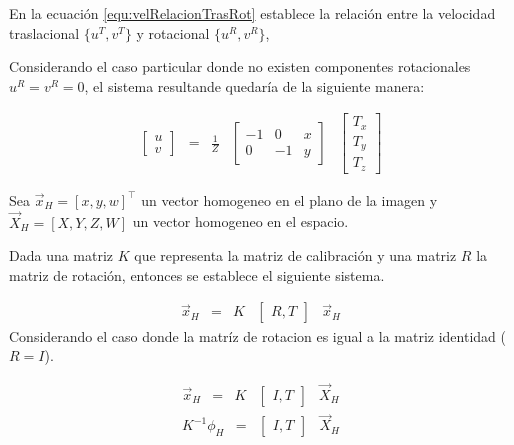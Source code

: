 En la ecuación \ref{equ:velRelacionTrasRot} establece la relación entre la velocidad traslacional $\{u^T,v^T\}$ y rotacional $\{u^R,v^R\}$,  

Considerando el caso particular donde no existen componentes rotacionales $u^R = v^R = 0$, el sistema resultande quedaría de la siguiente manera:

\begin{equation}
    \begin{aligned}
    \left[\begin{array}{c}
u \\
v
\end{array}\right]&=&\frac{1}{Z}&\left[\begin{array}{ccc}
    -1 & 0 & x  \\
     0 &-1 & y
\end{array}\right]&\left[\begin{array}{c}
T_x \\
T_y\\
T_z
\end{array}\right]   
\end{aligned}
\label{equ:flujoOpticoSistema}
\end{equation}

Sea $\vec{x}_H =[x,y,w]^\top$ un vector homogeneo en el plano de la imagen y $\vec{X}_H = [X,Y,Z,W]$ un vector homogeneo en el espacio.

Dada una matriz $K$ que representa la matriz de calibración y una matriz $R$ la matriz de rotación, entonces se establece el siguiente sistema.

\begin{equation}
    \begin{aligned}
    \vec{x}_H&=&K&\left[\begin{array}{cc}
    R,T
\end{array}\right]&\vec{x}_H   
\end{aligned}
\label{equ:Homografia1}
\end{equation}
Considerando el caso donde la matríz de rotacion es igual a la matriz identidad ($R = I$).

\begin{equation*}
    \begin{aligned}
    \vec{x}_H&=&K&\left[\begin{array}{cc}
    I,T
\end{array}\right]&\vec{X}_H   
\end{aligned}
\end{equation*}
\begin{equation*}
    \begin{aligned}
    K^{-1}\phi_H&=&\left[\begin{array}{cc}
    I,T
\end{array}\right]&\vec{X}_H   
\end{aligned}
\end{equation*}

